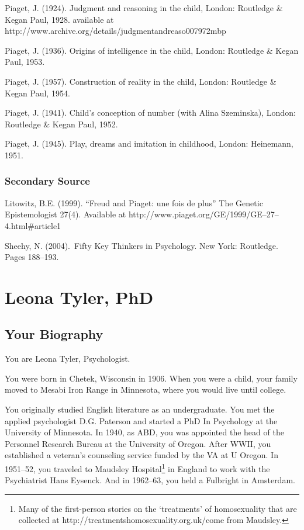 \begin{refsection}
Piaget, J. (1924). Judgment and reasoning in the child, London: Routledge \& Kegan Paul, 1928. available at http:\slash \slash www.archive.org\slash details\slash judgmentandreaso007972mbp

Piaget, J. (1936). Origins of intelligence in the child, London: Routledge \& Kegan Paul, 1953.

Piaget, J. (1957). Construction of reality in the child, London: Routledge \& Kegan Paul, 1954.

Piaget, J. (1941). Child's conception of number (with Alina Szeminska), London: Routledge \& Kegan Paul, 1952.

Piaget, J. (1945). Play, dreams and imitation in childhood, London: Heinemann, 1951.

\subsection{Secondary Source}
\label{secondarysource}

Litowitz, B.E. (1999). ``Freud and Piaget: une fois de plus'' The Genetic Epistemologist 27(4). Available at http:\slash \slash www.piaget.org\slash GE\slash 1999\slash GE--27--4.html\#article1

Sheehy, N. (2004). Fifty Key Thinkers in Psychology. New York: Routledge. Pages 188--193.

\chapter{Leona Tyler, PhD}
\label{leonatylerphd}

\section{Your Biography}
\label{yourbiography}

You are Leona Tyler, Psychologist.

You were born in Chetek, Wisconsin in 1906. When you were a child, your family moved to Mesabi Iron Range in Minnesota, where you would live until college.

You originally studied English literature as an undergraduate. You met the applied psychologist D.G. Paterson and started a PhD In Psychology at the University of Minnesota. In 1940, as ABD, you was appointed the head of the Personnel Research Bureau at the University of Oregon. After WWII, you established a veteran's counseling service funded by the VA at U Oregon. In 1951--52, you traveled to Maudsley Hospital\footnote{Many of the first-person stories on the `treatments' of homosexuality that are collected at http:\slash \slash treatmentshomosexuality.org.uk\slash  come from Maudsley.} in England to work with the Psychiatrist Hans Eysenck. And in 1962--63, you held a Fulbright in Amsterdam.


\end{refsection}
